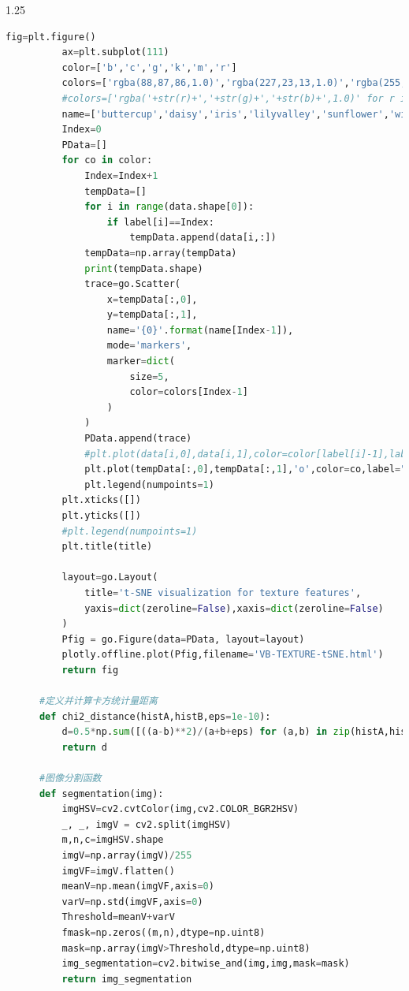 \documentclass[supercite]{HustGraduPaper}
\begin{document}
\begin{sloppypar}
\begin{appendices}
\begin{spacing}{1.25}
\begin{lstlisting}[language=python]
          fig=plt.figure()
          ax=plt.subplot(111)
          color=['b','c','g','k','m','r']
          colors=['rgba(88,87,86,1.0)','rgba(227,23,13,1.0)','rgba(255,192,203,1.0)','rgba(3,168,158,1.0)','rgba(227,207,87,1.0)','rgba(138,43,226,1.0)']
          #colors=['rgba('+str(r)+','+str(g)+','+str(b)+',1.0)' for r in np.linspace(25,168,6) for g in np.linspace(40,80,6) for b in np.linspace(0,255,6)]
          name=['buttercup','daisy','iris','lilyvalley','sunflower','windflower']
          Index=0
          PData=[]
          for co in color:
              Index=Index+1
              tempData=[]
              for i in range(data.shape[0]):
                  if label[i]==Index:
                      tempData.append(data[i,:])
              tempData=np.array(tempData)
              print(tempData.shape)
              trace=go.Scatter(
                  x=tempData[:,0],
                  y=tempData[:,1],
                  name='{0}'.format(name[Index-1]),
                  mode='markers',
                  marker=dict(
                      size=5,
                      color=colors[Index-1]
                  )
              )
              PData.append(trace)
              #plt.plot(data[i,0],data[i,1],color=color[label[i]-1],label="{0}".format(name[label[i]-1]))
              plt.plot(tempData[:,0],tempData[:,1],'o',color=co,label="{0}".format(name[Index-1]))
              plt.legend(numpoints=1)
          plt.xticks([])
          plt.yticks([])
          #plt.legend(numpoints=1)
          plt.title(title)
      
          layout=go.Layout(
              title='t-SNE visualization for texture features',
              yaxis=dict(zeroline=False),xaxis=dict(zeroline=False)
          )
          Pfig = go.Figure(data=PData, layout=layout)
          plotly.offline.plot(Pfig,filename='VB-TEXTURE-tSNE.html')
          return fig
      
      #定义并计算卡方统计量距离
      def chi2_distance(histA,histB,eps=1e-10):
          d=0.5*np.sum([((a-b)**2)/(a+b+eps) for (a,b) in zip(histA,histB)])
          return d
      
      #图像分割函数
      def segmentation(img):
          imgHSV=cv2.cvtColor(img,cv2.COLOR_BGR2HSV)
          _, _, imgV = cv2.split(imgHSV)
          m,n,c=imgHSV.shape
          imgV=np.array(imgV)/255
          imgVF=imgV.flatten()
          meanV=np.mean(imgVF,axis=0)
          varV=np.std(imgVF,axis=0)
          Threshold=meanV+varV
          fmask=np.zeros((m,n),dtype=np.uint8)
          mask=np.array(imgV>Threshold,dtype=np.uint8)
          img_segmentation=cv2.bitwise_and(img,img,mask=mask)
          return img_segmentation
      

\end{lstlisting}
\end{spacing}
\end{appendices}
\end{sloppypar}
\end{document}
